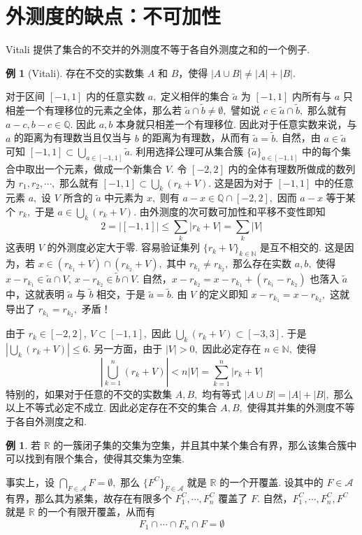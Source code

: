 \documentclass[12pt, a4paper, oneside]{book}
\numberwithin{figure}{section}
\theoremstyle{definition}
\newtheorem{example}[theorem]{例}
\begin{document}
\section{外测度的缺点：不可加性} Vitali 提供了集合的不交并的外测度不等于各自外测度之和的一个例子. 
\begin{example}[Vitali]\label{ex:non_additivity_of_outer_measure}
    存在不交的实数集 $A$ 和 $B$，使得 $|A\cup B|\neq |A|+|B|.$
\end{example}
对于区间 $[-1,1]$ 内的任意实数 $a,$ 定义相伴的集合 $\tilde a$ 为 $[-1,1]$ 内所有与 $a$ 只相差一个有理移位的元素之全体，那么若 $\tilde a\cap\tilde b\neq \emptyset,$ 譬如说 $c\in\tilde a\cap\tilde b,$ 那么就有 
$a-c,b-c\in\mathbb Q.$ 因此 $a,b$ 本身就只相差一个有理移位. 因此对于任意实数来说，与 $a$ 的距离为有理数当且仅当与 $b$ 的距离为有理数，从而有 $\tilde a=\tilde b.$ 
自然，由 $a\in\tilde a$ 可知 $[-1,1]\subset \bigcup_{a\in [-1,1]}\tilde a.$ 利用选择公理可从集合簇 $\{\tilde a\}_{a\in [-1,1]}$ 中的每个集合中取出一个元素，做成一个新集合 $V.$ 令 $[-2,2]$ 内的全体有理数所做成的数列为 $r_1,r_2,\cdots,$ 
那么就有 $[-1,1]\subset\bigcup_{k} (r_k+V).$ 这是因为对于 $[-1,1]$ 中的任意元素 $a,$ 设 $V$ 所含的 $\tilde a$ 中元素为 $x,$ 则有 $a-x\in\mathbb Q\cap [-2,2],$ 因而 $a-x$ 等于某个 $r_k,$ 于是 $a\in \bigcup_{k} (r_k+V).$ 
由外测度的次可数可加性和平移不变性即知
\begin{equation}
    2=|[-1,1]|\leq\sum_k |r_k+V|=\sum_k |V|
\end{equation}
这表明 $V$ 的外测度必定大于零. 容易验证集列 $\{r_k+V\}_{k\in\mathbb N}$ 是互不相交的. 这是因为，若 $x\in (r_{k_1}+V)\cap (r_{k_2}+V),$ 其中 $r_{k_1}\neq r_{k_2},$ 那么存在实数 $a,b,$ 使得 $x-r_{k_1}\in \tilde a\cap V,\ x-r_{k_2}\in\tilde b\cap V.$ 自然，$x-r_{k_2}=x-r_{k_1}+(r_{k_1}-r_{k_2})$ 也落入 $\tilde a$ 中，这就表明 $\tilde a$ 与 $\tilde b$ 相交，于是 $\tilde a=\tilde b.$ 由 $V$ 的定义即知 $x-r_{k_1}=x-r_{k_2},$ 这就导出了 $r_{k_1}=r_{k_2},$ 矛盾！

由于 $r_k\in [-2,2],\ V\subset [-1,1],$ 因此 $\bigcup_k (r_k+V)\subset [-3,3].$ 于是 $|\bigcup_k (r_k+V)|\leq 6.$ 另一方面，由于 $|V|>0,$ 因此必定存在 $n\in\mathbb N,$ 使得 
\begin{equation}
    \left|\bigcup_{k=1}^n (r_k+V)\right|< n|V|=\sum_{k=1}^n |r_k+V|
\end{equation}
特别的，如果对于任意的不交的实数集 $A,B,$ 均有等式 $|A\cup B|=|A|+|B|,$ 那么以上不等式必定不成立. 因此必定存在不交的集合 $A,B,$ 使得其并集的外测度不等于各自外测度之和.

\begin{example}
    若 $\mathbb R$ 的一簇闭子集的交集为空集，并且其中某个集合有界，那么该集合簇中可以找到有限个集合，使得其交集为空集.
\end{example}
事实上，设 $\bigcap_{F\in\mathcal A}F=\emptyset,$ 那么 $\{F^C\}_{F\in\mathcal A}$ 就是 $\mathbb R$ 的一个开覆盖. 设其中的 $F\in \mathcal A$ 有界，那么其为紧集，故存在有限多个 $F_1^C,\cdots,F_n^C$ 覆盖了 $F.$ 自然，$F_1^C,\cdots,F_n^C,F^C$ 就是 $\mathbb R$ 的一个有限开覆盖，从而有 
\begin{equation}
    F_1\cap\cdots\cap F_n\cap F=\emptyset
\end{equation}
\end{document}
